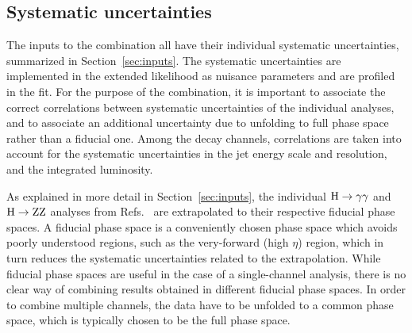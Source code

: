 \subsection{Systematic uncertainties}
\label{sec:systematics}


The inputs to the combination all have their individual systematic uncertainties, summarized in Section~\ref{sec:inputs}.
% 
The systematic uncertainties are implemented in the extended likelihood as nuisance parameters and are profiled in the fit.
% 
For the purpose of the combination, it is important to associate the correct correlations between systematic uncertainties of the individual analyses, and to associate an additional uncertainty due to unfolding to full phase space rather than a fiducial one.
% 
Among the decay channels, correlations are taken into account for the systematic uncertainties in the jet energy scale and resolution, and the integrated luminosity.


As explained in more detail in Section~\ref{sec:inputs}, the individual $\mathrm{H}\to\mathrm{\gamma}\mathrm{\gamma}$ and $\mathrm{H}\to\mathrm{Z}\mathrm{Z}$ analyses from Refs.~\cite{Sirunyan:2018kta,Sirunyan:2017exp} are extrapolated to their respective fiducial phase spaces.
% 
A fiducial phase space is a conveniently chosen phase space which avoids poorly understood regions, such as the very-forward (high $\eta$) region, which in turn reduces the systematic uncertainties related to the extrapolation.
% 
While fiducial phase spaces are useful in the case of a single-channel analysis, there is no clear way of combining results obtained in different fiducial phase spaces.
% 
In order to combine multiple channels, the data have to be unfolded to a common phase space, which is typically chosen to be the full phase space.
% 



